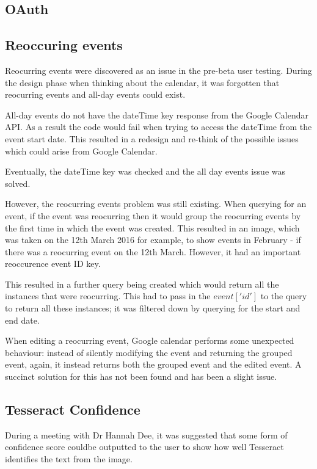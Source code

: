 \subsection{OAuth}

\subsection{Reoccuring events}
Reocurring events were discovered as an issue in the pre-beta user testing. During the design phase when thinking about the calendar, it was forgotten that reocurring events and all-day events could exist.

All-day events do not have the dateTime key response from the Google Calendar API. As a result the code would fail when trying to access the dateTime from the event start date. This resulted in a redesign and re-think of the possible issues which could arise from Google Calendar.

Eventually, the dateTime key was checked and the all day events issue was solved.

However, the reocurring events problem was still existing. When querying for an event, if the event was reocurring then it would group the reocurring events by the first time in which the event was created. This resulted in an image, which was taken on the 12th March 2016 for example, to show events in February - if there was a reocurring event on the 12th March. However, it had an important reoccurence event ID key.

This resulted in a further query being created which would return all the instances that were reocurring. This had to pass in the $event['id']$ to the query to return all these instances; it was filtered down by querying for the start and end date.

When editing a reocurring event, Google calendar performs some unexpected behaviour: instead of silently modifying the event and returning the grouped event, again, it instead returns both the grouped event and the edited event. A succinct solution for this has not been found and has been a slight issue.

\subsection{Tesseract Confidence}
During a meeting with Dr Hannah Dee, it was suggested that some form of confidence score couldbe outputted to the user to show how well Tesseract identifies the text from the image.

